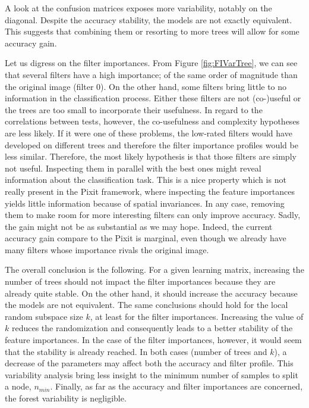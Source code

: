 \documentclass[a4paper]{report}
\begin{document}
		\par
		A look at the confusion matrices exposes more variability, notably on the diagonal. Despite the accuracy stability, the models are not exactly equivalent. This suggests that combining them or resorting to more trees will allow for some accuracy gain.
		\par
		Let us digress on the filter importances. From Figure \ref{fig:FIVarTree}, we can see that several filters have a high importance; of the same order of magnitude than the original image (filter 0). On the other hand, some filters bring little to no information in the classification process. Either these filters are not (co-)useful or the trees are too small to incorporate their usefulness. In regard to the correlations between tests, however, the co-usefulness and complexity hypotheses are less likely. If it were one of these problems, the low-rated filters would have developed on different trees and therefore the filter importance profiles would be less similar. Therefore, the most likely hypothesis is that those filters are simply not useful. Inspecting them in parallel with the best ones might reveal information about the classification task. This is a nice property which is not really present in the Pixit framework, where inspecting the feature importances yields little information because of spatial invariances. In any case, removing them to make room for more interesting filters can only improve accuracy. Sadly, the gain might not be as substantial as we may hope. Indeed, the current accuracy gain compare to the Pixit is marginal, even though we already have many filters whose importance rivals the original image. 
		\par
		The overall conclusion is the following. For a given learning matrix, increasing the number of trees should not impact the filter importances because they are already quite stable. On the other hand, it should increase the accuracy because the models are not equivalent. The same conclusions should hold for the local random subspace size $k$, at least for the filter importances. Increasing the value of $k$ reduces the randomization and consequently leads to a better stability of the feature importances. In the case of the filter importances, however, it would seem that the stability is already reached. In both cases (number of trees and $k$), a decrease of the parameters may affect both the accuracy and filter profile. This variability analysis bring less insight to the minimum number of samples to split a node, $n_{min}$. Finally, as far as the accuracy and filter importances are concerned, the forest variability is negligible.
\end{document}
